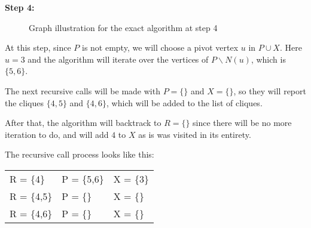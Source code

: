 \begin{minipage}{\linewidth}
    \textbf{Step 4:} \newline
    \begin{minipage}{0.4\textwidth}
        \begin{figure}[H]
            \centering
            \caption{Graph illustration for the exact algorithm at step 4}
            \label{fig:exact-mewc-step4}
        \end{figure}
    \end{minipage}
    \begin{minipage}{0.6\textwidth}
        At this step, since $P$ is not empty, we will choose a pivot vertex $u$
        in $P\cup X$. Here $u = 3$ and the algorithm will iterate over the
        vertices of $P\backslash N(u)$, which is $\{5,6\}$. \newline

        The next recursive calls will be made with $P = \{\}$ and $X = \{\}$, so
        they will report the cliques $\{4,5\}$ and $\{4,6\}$, which will be
        added to the list of cliques. \newline

        After that, the algorithm will backtrack to $R=\{\}$ since there will be
        no more iteration to do, and will add $4$ to $X$ as is was visited in
        its entirety. \newline

        The recursive call process looks like this:
        \begin{center}
            \begin{tabular}{|lll|}
                \hline
                R = \{4\} & P = \{5,6\} & X = \{3\} \\
                R = \{4,5\} & P = \{\} & X = \{\} \\
                R = \{4,6\} & P = \{\} & X = \{\} \\
                \hline
            \end{tabular}
        \end{center}
    \end{minipage}
\end{minipage} \newline

